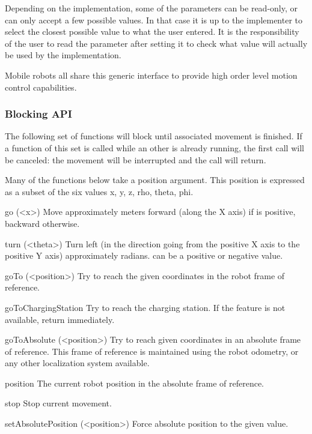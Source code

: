 Depending on the implementation, some of the parameters can be read-only, or
can only accept a few possible values. In that case it is up to the implementer
to select the closest possible value to what the user entered. It is the
responsibility of the user to read the parameter after setting it to check
what value will actually be used by the implementation.



Mobile robots all share this generic interface to provide high order
level motion control capabilities.

\subsubsection{Blocking API}

The following set of functions will block until associated movement is
finished.  If a function of this set is called while an other is already
running, the first call will be canceled: the movement will be interrupted
and the call will return.

Many of the functions below take a position argument. This position is
expressed as a subset of the six values x, y, z, rho, theta, phi.

\begin{urbiscriptapi}
\item[go](<x>) Move approximately  meters forward (along the X axis)
  if  is positive, backward otherwise.

\item[turn](<theta>) Turn left (in the direction going from the positive X
  axis to the positive Y axis) approximately  radians.
   can be a positive or negative value.

\item[goTo](<position>) Try to reach the given coordinates in the robot
  frame of reference.

\item[goToChargingStation] Try to reach the charging station. If the feature
  is not available, return immediately.

\item[goToAbsolute](<position>) Try to reach given coordinates in an
  absolute frame of reference. This frame of reference is maintained using
  the robot odometry, or any other localization system available.

\item[position] The current robot position in the absolute frame of
  reference.

\item[stop] Stop current movement.

\item[setAbsolutePosition](<position>) Force absolute position to the given
  value.
\end{urbiscriptapi}

